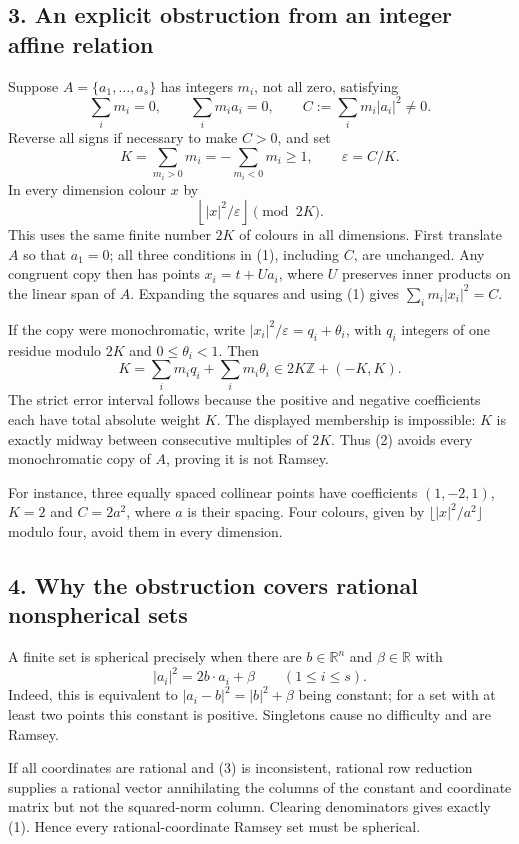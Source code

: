 \subsection*{3. An explicit obstruction from an integer affine relation}
Suppose $A=\{a_1,\ldots,a_s\}$ has integers $m_i$, not all zero, satisfying
\[
 \sum_i m_i=0,\qquad \sum_i m_i a_i=0,\qquad
 C:=\sum_i m_i|a_i|^2\ne0.\tag{1}
\]
Reverse all signs if necessary to make $C>0$, and set
\[
 K=\sum_{m_i>0}m_i=-\sum_{m_i<0}m_i\ge1,
 \qquad \varepsilon=C/K.
\]
In every dimension colour $x$ by
\[
 \left\lfloor |x|^2/\varepsilon\right\rfloor\pmod {2K}.\tag{2}
\]
This uses the same finite number $2K$ of colours in all dimensions. First translate $A$ so that $a_1=0$; all three conditions in (1), including $C$, are unchanged. Any congruent copy then has points $x_i=t+Ua_i$, where $U$ preserves inner products on the linear span of $A$. Expanding the squares and using (1) gives $\sum_i m_i|x_i|^2=C$.

If the copy were monochromatic, write $|x_i|^2/\varepsilon=q_i+\theta_i$, with $q_i$ integers of one residue modulo $2K$ and $0\le\theta_i<1$. Then
\[
 K=\sum_i m_iq_i+\sum_i m_i\theta_i\in 2K\mathbb Z+(-K,K).
\]
The strict error interval follows because the positive and negative coefficients each have total absolute weight $K$. The displayed membership is impossible: $K$ is exactly midway between consecutive multiples of $2K$. Thus (2) avoids every monochromatic copy of $A$, proving it is not Ramsey.

For instance, three equally spaced collinear points have coefficients $(1,-2,1)$, $K=2$ and $C=2a^2$, where $a$ is their spacing. Four colours, given by $\lfloor |x|^2/a^2\rfloor$ modulo four, avoid them in every dimension.

\subsection*{4. Why the obstruction covers rational nonspherical sets}
A finite set is spherical precisely when there are $b\in\mathbb R^n$ and $\beta\in\mathbb R$ with
\[
 |a_i|^2=2b\cdot a_i+\beta\qquad(1\le i\le s).\tag{3}
\]
Indeed, this is equivalent to $|a_i-b|^2=|b|^2+\beta$ being constant; for a set with at least two points this constant is positive. Singletons cause no difficulty and are Ramsey.

If all coordinates are rational and (3) is inconsistent, rational row reduction supplies a rational vector annihilating the columns of the constant and coordinate matrix but not the squared-norm column. Clearing denominators gives exactly (1). Hence every rational-coordinate Ramsey set must be spherical.

